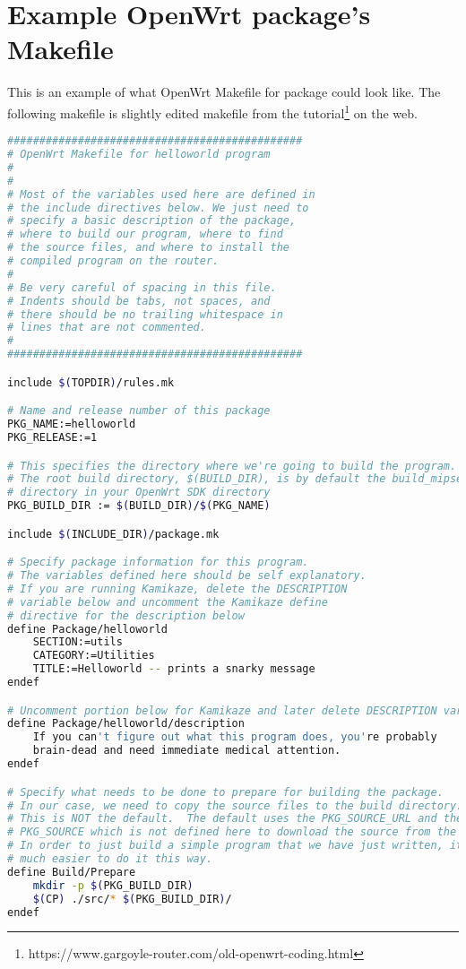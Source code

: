 \chapter{Example OpenWrt package's Makefile}\label{hello_mkfile}
This is an example of what OpenWrt Makefile for package could look like.
The following makefile is slightly edited makefile from the tutorial\footnote{https://www.gargoyle-router.com/old-openwrt-coding.html} on the web.
\begin{lstlisting}[language=bash,basicstyle=\ttfamily\footnotesize,caption=Makefile for Helloworld.]
##############################################
# OpenWrt Makefile for helloworld program
#
#
# Most of the variables used here are defined in
# the include directives below. We just need to
# specify a basic description of the package,
# where to build our program, where to find
# the source files, and where to install the
# compiled program on the router.
#
# Be very careful of spacing in this file.
# Indents should be tabs, not spaces, and
# there should be no trailing whitespace in
# lines that are not commented.
#
##############################################

include $(TOPDIR)/rules.mk

# Name and release number of this package
PKG_NAME:=helloworld
PKG_RELEASE:=1

# This specifies the directory where we're going to build the program.
# The root build directory, $(BUILD_DIR), is by default the build_mipsel
# directory in your OpenWrt SDK directory
PKG_BUILD_DIR := $(BUILD_DIR)/$(PKG_NAME)

include $(INCLUDE_DIR)/package.mk

# Specify package information for this program.
# The variables defined here should be self explanatory.
# If you are running Kamikaze, delete the DESCRIPTION
# variable below and uncomment the Kamikaze define
# directive for the description below
define Package/helloworld
	SECTION:=utils
	CATEGORY:=Utilities
	TITLE:=Helloworld -- prints a snarky message
endef

# Uncomment portion below for Kamikaze and later delete DESCRIPTION variable above
define Package/helloworld/description
	If you can't figure out what this program does, you're probably
	brain-dead and need immediate medical attention.
endef

# Specify what needs to be done to prepare for building the package.
# In our case, we need to copy the source files to the build directory.
# This is NOT the default.  The default uses the PKG_SOURCE_URL and the
# PKG_SOURCE which is not defined here to download the source from the web.
# In order to just build a simple program that we have just written, it is
# much easier to do it this way.
define Build/Prepare
	mkdir -p $(PKG_BUILD_DIR)
	$(CP) ./src/* $(PKG_BUILD_DIR)/
endef


\end{lstlisting}
